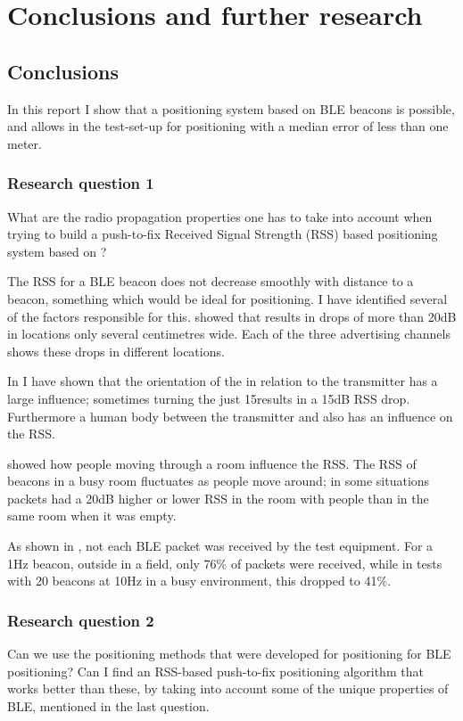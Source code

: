 \chapter{Conclusions and further research}
\section{Conclusions}
In this report I show that a positioning system based on BLE beacons is possible, and allows in the test-set-up for positioning with a median error of less than one meter.

\subsection{Research question 1}
\begin{em}
    What are the radio propagation properties one has to take into account when trying to build a push-to-fix Received Signal Strength (RSS) based positioning system based on \BLE?
\end{em}

The RSS for a BLE beacon does not decrease smoothly with distance to a beacon, something which would be ideal for positioning.
I have identified several of the factors responsible for this.
 showed that \mpi results in drops of more than 20dB in locations only several centimetres wide.
Each of the three advertising channels shows these drops in different locations.

In  I have shown that the orientation of the \device in relation to the transmitter has a large influence; sometimes turning the \device just 15\tdegree results in a 15dB RSS drop.
Furthermore a human body between the transmitter and \device also has an influence on the RSS.

 showed how people moving through a room influence the RSS.
The RSS of beacons in a busy room fluctuates as people move around; in some situations packets had a 20dB higher or lower RSS in the room with people than in the same room when it was empty.

As shown in , not each BLE packet was received by the test equipment.
For a 1Hz beacon, outside in a field, only 76\% of packets were received, while in tests with 20 beacons at 10Hz in a busy environment, this dropped to 41\%.

\subsection{Research question 2}
\begin{em}
    Can we use the positioning methods that were developed for \wifi positioning for BLE positioning?
    Can I find an RSS-based push-to-fix positioning algorithm that works better than these, by taking into account some of the unique properties of BLE, mentioned in the last question.
\end{em}


